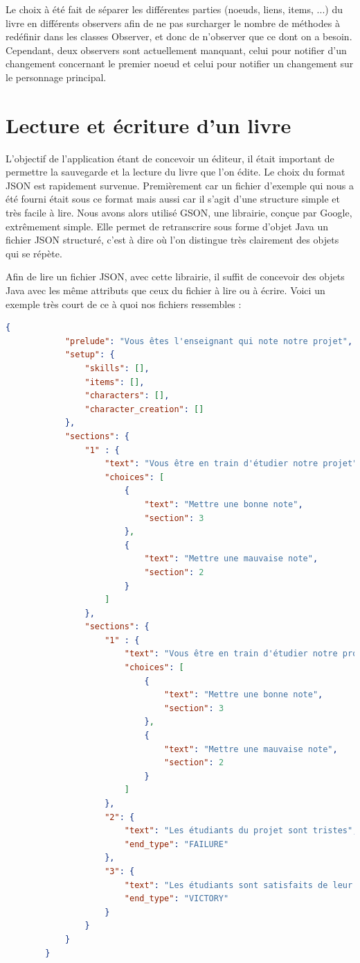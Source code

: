 			Le choix à été fait de séparer les différentes parties (noeuds, liens, items, ...) du livre en différents observers afin de ne pas surcharger le nombre de méthodes à redéfinir dans les classes Observer, et donc de n'observer que ce dont on a besoin. Cependant, deux observers sont actuellement manquant, celui pour notifier d'un changement concernant le premier noeud et celui pour notifier un changement sur le personnage principal.

	\section{Lecture et écriture d'un livre}\label{sec:Json}

		L'objectif de l'application étant de concevoir un éditeur, il était important de permettre la sauvegarde et la lecture du livre que l'on édite. Le choix du format JSON est rapidement survenue. Premièrement car un fichier d'exemple qui nous a été fourni était sous ce format mais aussi car il s'agit d'une structure simple et très facile à lire. Nous avons alors utilisé GSON, une librairie, conçue par Google, extrêmement simple. Elle permet de retranscrire sous forme d'objet Java un fichier JSON structuré, c'est à dire où l'on distingue très clairement des objets qui se répète.

		Afin de lire un fichier JSON, avec cette librairie, il suffit de concevoir des objets Java avec les même attributs que ceux du fichier à lire ou à écrire. Voici un exemple très court de ce à quoi nos fichiers ressembles :

		\begin{lstlisting}[gobble=8, language=json, caption=Exemple de livre très simple, label=lst:exemple_livre]
		{
			"prelude": "Vous êtes l'enseignant qui note notre projet",
			"setup": {
				"skills": [],
				"items": [],
				"characters": [],
				"character_creation": []
			},
			"sections": {
				"1" : {
					"text": "Vous être en train d'étudier notre projet",
					"choices": [
						{
							"text": "Mettre une bonne note",
							"section": 3
						},
						{
							"text": "Mettre une mauvaise note",
							"section": 2
						}
					]
				},
				"sections": {
					"1" : {
						"text": "Vous être en train d'étudier notre projet",
						"choices": [
							{
								"text": "Mettre une bonne note",
								"section": 3
							},
							{
								"text": "Mettre une mauvaise note",
								"section": 2
							}
						]
					},
					"2": {
						"text": "Les étudiants du projet sont tristes",
						"end_type": "FAILURE"
					},
					"3": {
						"text": "Les étudiants sont satisfaits de leur travail",
						"end_type": "VICTORY"
					}
				}
			}
		}
		\end{lstlisting}

